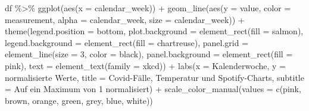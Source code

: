 \documentclass[
]{book}
\newenvironment{Shaded}{\begin{snugshade}}{\end{snugshade}}
\newcommand{\AttributeTok}[1]{\textcolor[rgb]{0.77,0.63,0.00}{#1}}
\newcommand{\DecValTok}[1]{\textcolor[rgb]{0.00,0.00,0.81}{#1}}
\newcommand{\FunctionTok}[1]{\textcolor[rgb]{0.00,0.00,0.00}{#1}}
\newcommand{\NormalTok}[1]{#1}
\newcommand{\SpecialCharTok}[1]{\textcolor[rgb]{0.00,0.00,0.00}{#1}}
\newcommand{\StringTok}[1]{\textcolor[rgb]{0.31,0.60,0.02}{#1}}
\begin{document}
\begin{Shaded}
\begin{Highlighting}[]
\NormalTok{df }\SpecialCharTok{\%\textgreater{}\%} 
  \FunctionTok{ggplot}\NormalTok{(}\FunctionTok{aes}\NormalTok{(}\AttributeTok{x =}\NormalTok{ calendar\_week)) }\SpecialCharTok{+}
  \FunctionTok{geom\_line}\NormalTok{(}\FunctionTok{aes}\NormalTok{(}\AttributeTok{y =}\NormalTok{ value, }
                \AttributeTok{color =}\NormalTok{ measurement, }
                \AttributeTok{alpha =}\NormalTok{ calendar\_week,}
                \AttributeTok{size =}\NormalTok{ calendar\_week)) }\SpecialCharTok{+}
  \FunctionTok{theme}\NormalTok{(}\AttributeTok{legend.position =} \StringTok{\textquotesingle{}bottom\textquotesingle{}}\NormalTok{,}
        \AttributeTok{plot.background =} \FunctionTok{element\_rect}\NormalTok{(}\AttributeTok{fill =} \StringTok{\textquotesingle{}salmon\textquotesingle{}}\NormalTok{),}
        \AttributeTok{legend.background =} \FunctionTok{element\_rect}\NormalTok{(}\AttributeTok{fill =} \StringTok{\textquotesingle{}chartreuse\textquotesingle{}}\NormalTok{),}
        \AttributeTok{panel.grid =} \FunctionTok{element\_line}\NormalTok{(}\AttributeTok{size =} \DecValTok{3}\NormalTok{, }\AttributeTok{color =} \StringTok{\textquotesingle{}black\textquotesingle{}}\NormalTok{),}
        \AttributeTok{panel.background =} \FunctionTok{element\_rect}\NormalTok{(}\AttributeTok{fill =} \StringTok{\textquotesingle{}pink\textquotesingle{}}\NormalTok{),}
        \AttributeTok{text =} \FunctionTok{element\_text}\NormalTok{(}\AttributeTok{family =} \StringTok{\textquotesingle{}xkcd\textquotesingle{}}\NormalTok{)) }\SpecialCharTok{+}
  \FunctionTok{labs}\NormalTok{(}\AttributeTok{x =} \StringTok{\textquotesingle{}Kalenderwoche\textquotesingle{}}\NormalTok{,}
       \AttributeTok{y =} \StringTok{\textquotesingle{}normalisierte Werte\textquotesingle{}}\NormalTok{,}
       \AttributeTok{title =} \StringTok{\textquotesingle{}Covid{-}Fälle, Temperatur und Spotify{-}Charts\textquotesingle{}}\NormalTok{,}
       \AttributeTok{subtitle =} \StringTok{\textquotesingle{}Auf ein Maximum von 1 normalisiert\textquotesingle{}}\NormalTok{) }\SpecialCharTok{+}
  \FunctionTok{scale\_color\_manual}\NormalTok{(}\AttributeTok{values =} \FunctionTok{c}\NormalTok{(}\StringTok{\textquotesingle{}pink\textquotesingle{}}\NormalTok{, }\StringTok{\textquotesingle{}brown\textquotesingle{}}\NormalTok{, }\StringTok{\textquotesingle{}orange\textquotesingle{}}\NormalTok{, }\StringTok{\textquotesingle{}green\textquotesingle{}}\NormalTok{, }\StringTok{\textquotesingle{}grey\textquotesingle{}}\NormalTok{, }\StringTok{\textquotesingle{}blue\textquotesingle{}}\NormalTok{, }\StringTok{\textquotesingle{}white\textquotesingle{}}\NormalTok{))}
\end{Highlighting}
\end{Shaded}
\end{document}
